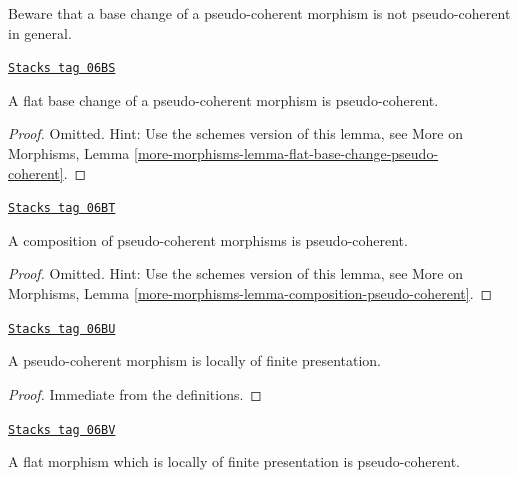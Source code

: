 Beware that a base change of a pseudo-coherent morphism is not
pseudo-coherent in general.

\begin{lemma}
\label{spaces-more-morphisms-lemma-flat-base-change-pseudo-coherent}
\href{https://stacks.math.columbia.edu/tag/06BS}{\texttt{Stacks tag 06BS}}

A flat base change of a pseudo-coherent morphism is pseudo-coherent.
\end{lemma}

\begin{proof}
Omitted. Hint: Use the schemes version of this lemma, see
More on Morphisms,
Lemma \ref{more-morphisms-lemma-flat-base-change-pseudo-coherent}.
\end{proof}

\begin{lemma}
\label{spaces-more-morphisms-lemma-composition-pseudo-coherent}
\href{https://stacks.math.columbia.edu/tag/06BT}{\texttt{Stacks tag 06BT}}

A composition of pseudo-coherent morphisms is pseudo-coherent.
\end{lemma}

\begin{proof}
Omitted. Hint: Use the schemes version of this lemma, see
More on Morphisms,
Lemma \ref{more-morphisms-lemma-composition-pseudo-coherent}.
\end{proof}

\begin{lemma}
\label{spaces-more-morphisms-lemma-pseudo-coherent-finite-presentation}
\href{https://stacks.math.columbia.edu/tag/06BU}{\texttt{Stacks tag 06BU}}

A pseudo-coherent morphism is locally of finite presentation.
\end{lemma}

\begin{proof}
Immediate from the definitions.
\end{proof}

\begin{lemma}
\label{spaces-more-morphisms-lemma-flat-finite-presentation-pseudo-coherent}
\href{https://stacks.math.columbia.edu/tag/06BV}{\texttt{Stacks tag 06BV}}

A flat morphism which is locally of finite presentation is pseudo-coherent.
\end{lemma}

